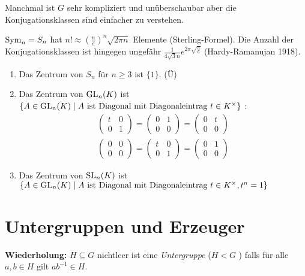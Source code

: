 Manchmal ist $G$ sehr kompliziert und unüberschaubar aber die Konjugationsklassen sind einfacher zu verstehen.

\begin{eg}
	$\operatorname{Sym}_{n} = S_{n}$ hat $n! \approx \left( \frac{n}{e} \right)^{n} \sqrt{2\pi n} $ Elemente (Sterling-Formel).
	Die Anzahl der Konjugationsklassen ist hingegen ungefähr $\frac{1}{4 \sqrt{3} n} e^{2\pi \sqrt{\frac{n}{6}}}$ (Hardy-Ramanujan 1918).
\end{eg}

\begin{eg}
	\begin{enumerate}[1)]
		\item Das Zentrum von $S_{n}$ für $n \geq 3$ ist $\{1\}$. (Ü)
		\item Das Zentrum von $\operatorname{GL}_{n}(K)$ ist $\{A \in \operatorname{GL}_{n}(K) \mid  A \text{ ist Diagonal mit Diagonaleintrag } t \in K^{\times}\}$ :
			\begin{align*}
			\begin{pmatrix} 
				t &0\\ 0 &1
			\end{pmatrix} = \begin{pmatrix} 
				0 &1\\ 0&0
			\end{pmatrix} = \begin{pmatrix} 
				0 &t\\ 0 & 0
			\end{pmatrix} \\
			\begin{pmatrix} 
				0 &0\\ 0 & 0
			\end{pmatrix} = \begin{pmatrix} 
				t &0\\ 0 &1
			\end{pmatrix} = \begin{pmatrix} 
				0 &1\\ 0 &0
			\end{pmatrix} 
			\end{align*}
		\item Das Zentrum von $\operatorname{SL}_{n}(K)$ ist $\{A \in \operatorname{GL}_{n}(K) \mid  A \text{ ist Diagonal mit Diagonaleintrag } t \in K^{\times}, t^{n} = 1\}$
	\end{enumerate}
\end{eg}

\section{Untergruppen und Erzeuger}
\textbf{Wiederholung:}
$H\subseteq G$ nichtleer ist eine \emph{Untergruppe} ($H<G$ ) falls für alle $a,b \in H$ gilt $ab^{-1} \in H$.

